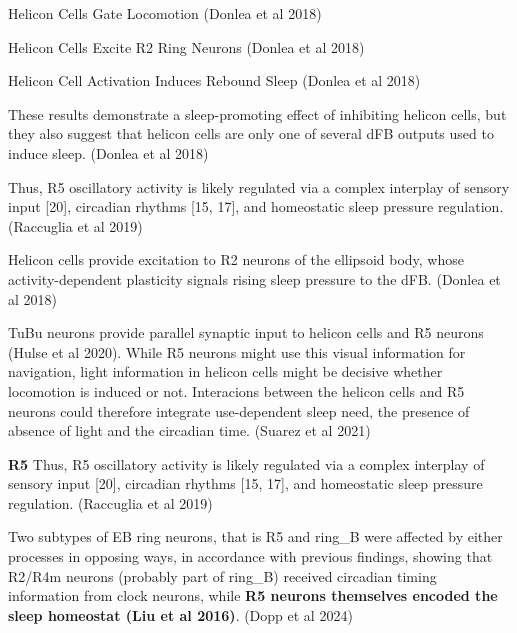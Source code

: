 Helicon Cells Gate Locomotion
\cite{donleaRecurrentCircuitryBalancing2018} (Donlea et al 2018)

Helicon Cells Excite R2 Ring Neurons
\cite{donleaRecurrentCircuitryBalancing2018} (Donlea et al 2018)

Helicon Cell Activation Induces Rebound Sleep
\cite{donleaRecurrentCircuitryBalancing2018} (Donlea et al 2018)

These results demonstrate a sleep-promoting effect of inhibiting helicon cells,
but they also suggest that helicon cells are only one of several dFB outputs
used to induce sleep.
\cite{donleaRecurrentCircuitryBalancing2018} (Donlea et al 2018)

Thus, R5 oscillatory activity is likely regulated via a complex interplay of
sensory input [20], circadian rhythms [15, 17], and homeostatic sleep pressure regulation.
\cite{raccugliaNetworkSpecificSynchronizationElectrical2019} (Raccuglia et al 2019)

Helicon cells provide excitation to R2 neurons of the ellipsoid body, whose
activity-dependent plasticity signals rising sleep pressure to the dFB.
\cite{donleaRecurrentCircuitryBalancing2018} (Donlea et al 2018)

TuBu neurons provide parallel synaptic input to helicon cells and R5 neurons (Hulse et al 2020).
While R5 neurons might use this visual information for navigation, light information in helicon cells might be
decisive whether locomotion is induced or not. Interacions between the helicon cells and R5
neurons could therefore integrate use-dependent sleep need, the presence of absence of light and the circadian time.
\cite{suarez-grimaltNeuralArchitectureSleep2021}
(Suarez et al 2021)

\noindent\hrulefill


\textbf{R5}
Thus, R5 oscillatory activity is likely regulated via a complex interplay of
sensory input [20], circadian rhythms [15, 17], and homeostatic sleep pressure regulation.
\cite{raccugliaNetworkSpecificSynchronizationElectrical2019} (Raccuglia et al 2019)

Two subtypes of EB ring neurons, that is R5 and ring\_B were affected by either
processes in opposing ways, in accordance with previous findings, showing that
R2/R4m neurons (probably part of ring\_B) received circadian timing
information from clock neurons, while
\textbf{R5 neurons themselves encoded the sleep homeostat (Liu et al 2016)}.
(Dopp et al 2024)


\noindent\hrulefill



